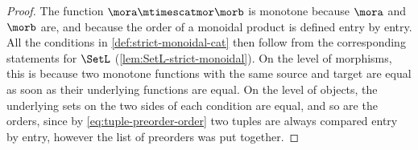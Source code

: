 \begin{proof}
    The function $\mora \mtimescatmor \morb$ is monotone because $\mora$ and $\morb$ are, and because the order of a monoidal product is defined entry by entry.
    All the conditions in \cref{def:strict-monoidal-cat} then follow from the corresponding statements for $\SetL$ (\cref{lem:SetL-strict-monoidal}).
    On the level of morphisms, this is because two monotone functions with the same source and target are equal as soon as their underlying functions are equal.
    On the level of objects, the underlying sets on the two sides of each condition are equal, and so are the orders, since by \cref{eq:tuple-preorder-order} two tuples are always compared entry by entry, however the list of preorders was put together.
\end{proof}

